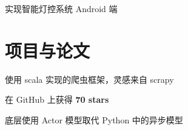 \documentclass[]{deedy-resume-openfont}
\begin{document}
\begin{minipage}[t]{0.3\textwidth}
\sectionsep
{}
\vspace{\topsep}
\begin{tightemize}
\item 实现智能灯控系统 Android 端
\end{tightemize}
\sectionsep


\section{项目与论文}
\sectionsep

\begin{tightemize}
    \item 使用 scala 实现的爬虫框架，灵感来自 scrapy
    \item 在 GitHub 上获得 \textbf{70 stars}
    \item 底层使用 Actor 模型取代 Python 中的异步模型
    \end{tightemize}
\sectionsep
\end{minipage}

\newpage
\pagestyle{fancy}
\fancyhf{}

\end{document}
